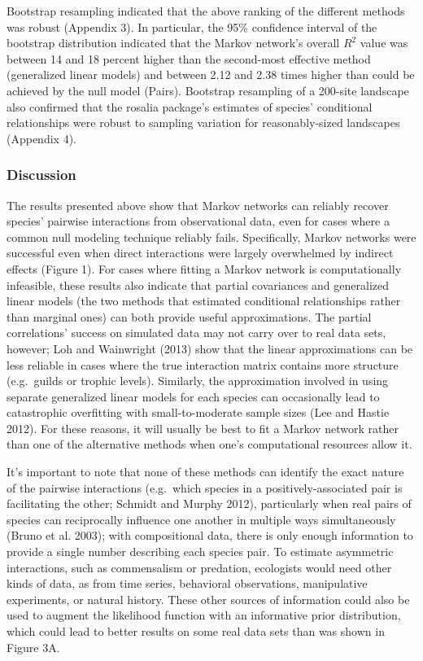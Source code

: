 \documentclass[12pt,]{article}
\begin{document}
\begin{spacing}{1.9}
\begin{flushleft}
Bootstrap resampling indicated that the above ranking of the different
methods was robust (Appendix 3). In particular, the 95\% confidence
interval of the bootstrap distribution indicated that the Markov
network's overall \(R^2\) value was between 14 and 18 percent higher
than the second-most effective method (generalized linear models) and
between 2.12 and 2.38 times higher than could be achieved by the null
model (Pairs). Bootstrap resampling of a 200-site landscape also
confirmed that the rosalia package's estimates of species' conditional
relationships were robust to sampling variation for reasonably-sized
landscapes (Appendix 4).

\subsubsection{Discussion}\label{discussion}

The results presented above show that Markov networks can reliably
recover species' pairwise interactions from observational data, even for
cases where a common null modeling technique reliably fails.
Specifically, Markov networks were successful even when direct
interactions were largely overwhelmed by indirect effects (Figure 1).
For cases where fitting a Markov network is computationally infeasible,
these results also indicate that partial covariances and generalized
linear models (the two methods that estimated conditional relationships
rather than marginal ones) can both provide useful approximations. The
partial correlations' success on simulated data may not carry over to
real data sets, however; Loh and Wainwright (2013) show that the linear
approximations can be less reliable in cases where the true interaction
matrix contains more structure (e.g.~guilds or trophic levels).
Similarly, the approximation involved in using separate generalized
linear models for each species can occasionally lead to catastrophic
overfitting with small-to-moderate sample sizes (Lee and Hastie 2012).
For these reasons, it will usually be best to fit a Markov network
rather than one of the alternative methods when one's computational
resources allow it.

It's important to note that none of these methods can identify the exact
nature of the pairwise interactions (e.g.~which species in a
positively-associated pair is facilitating the other; Schmidt and Murphy
2012), particularly when real pairs of species can reciprocally
influence one another in multiple ways simultaneously (Bruno et al.
2003); with compositional data, there is only enough information to
provide a single number describing each species pair. To estimate
asymmetric interactions, such as commensalism or predation, ecologists
would need other kinds of data, as from time series, behavioral
observations, manipulative experiments, or natural history. These other
sources of information could also be used to augment the likelihood
function with an informative prior distribution, which could lead to
better results on some real data sets than was shown in Figure 3A.


\end{flushleft}
\end{spacing}
\end{document}
